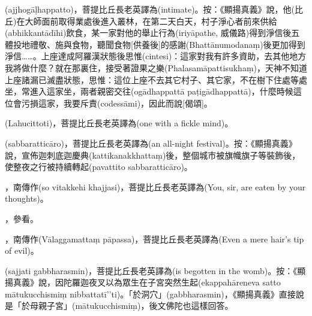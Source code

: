 \startitemgroup[noteitems]
\item{}(ajjhogāḷhappatto)，菩提比丘長老英譯為(intimate)。按：《顯揚真義》說，他(比丘)在大師面前取得業處後進入叢林，在第二天白天，村子淨心者前來供給(abhikkantādīhi)飲食，某一家對他的舉止行為(iriyāpathe, 威儀路)得到淨信後五體投地禮敬、施與食物，聽聞食物[供養後]的感謝(Bhattānumodanaṃ)後更加得到淨信……。上座達成阿羅漢狀態後思惟(cintesi)：這家對我有許多資助，去其他地方我將做什麼？就在那裏住，接受著證果之樂(Phalasamāpattisukhaṃ)，天神不知道上座諸漏已滅盡狀態，思惟：這位上座不去其它村子、其它家，不在樹下住處等處坐，常進入這家坐，兩者親密交往(ogādhappattā paṭigādhappattā)，什麼時候這位會污損這家，我要斥責(codessāmi)，因此而說[偈頌]。
\stopitemgroup

\startitemgroup[noteitems]
\item{}(Lahucittoti)，菩提比丘長老英譯為(one with a fickle mind)。
\stopitemgroup

\startitemgroup[noteitems]
\item{}(sabbaratticāro)，菩提比丘長老英譯為(an all-night festival)。按：《顯揚真義》說，宣佈迦刺底迦慶典(kattikanakkhattaṃ)後，整個城市被旗幟旗子等裝飾後，使整夜之行被持續轉起(pavattito sabbaratticāro)。
\stopitemgroup

\startitemgroup[noteitems]
\item{}，南傳作(so vitakkehi khajjasi)，菩提比丘長老英譯為(You, sir, are eaten by your thoughts)。
\stopitemgroup

\startitemgroup[noteitems]
\item{}，參看。
\stopitemgroup

\startitemgroup[noteitems]
\item{}，南傳作(Vālaggamattaṃ pāpassa)，菩提比丘長老英譯為(Even a mere hair's tip of evil)。
\stopitemgroup

\startitemgroup[noteitems]
\item{}(sajjati gabbharasmin)，菩提比丘長老英譯為(is begotten in the womb)。按：《顯揚真義》說，因陀羅迦夜叉以為眾生在子宮突然生起(ekappahāreneva satto mātukucchismiṃ nibbattatī’’ti)。「於洞穴」(gabbharasmin)，《顯揚真義》直接說是「於母親子宮」(mātukucchismiṃ)，後文佛陀也這樣回答。
\stopitemgroup

